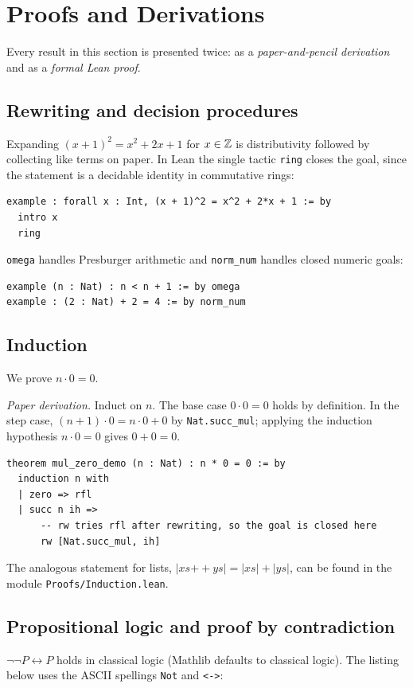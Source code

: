 \section{Proofs and Derivations}\label{sec:proofs}

Every result in this section is presented twice: as a \emph{paper-and-pencil
derivation} and as a \emph{formal Lean proof}.

\subsection{Rewriting and decision procedures}
Expanding $(x+1)^2 = x^2 + 2x + 1$ for $x\in\mathbb{Z}$ is distributivity followed
by collecting like terms on paper. In Lean the single tactic \texttt{ring}
closes the goal, since the statement is a decidable identity in commutative
rings:

\begin{lstlisting}
example : forall x : Int, (x + 1)^2 = x^2 + 2*x + 1 := by
  intro x
  ring
\end{lstlisting}

\texttt{omega} handles Presburger arithmetic and \texttt{norm\_num} handles
closed numeric goals:

\begin{lstlisting}
example (n : Nat) : n < n + 1 := by omega
example : (2 : Nat) + 2 = 4 := by norm_num
\end{lstlisting}

\subsection{Induction}
We prove $n\cdot 0 = 0$.

\noindent\emph{Paper derivation.} Induct on $n$. The base case
$0\cdot0=0$ holds by definition. In the step case,
$(n+1)\cdot0 = n\cdot0 + 0$ by \texttt{Nat.succ\_mul}; applying the
induction hypothesis $n\cdot0=0$ gives $0+0=0$.

\begin{lstlisting}
theorem mul_zero_demo (n : Nat) : n * 0 = 0 := by
  induction n with
  | zero => rfl
  | succ n ih =>
      -- rw tries rfl after rewriting, so the goal is closed here
      rw [Nat.succ_mul, ih]
\end{lstlisting}

The analogous statement for lists,
$|xs \mathbin{++} ys| = |xs|+|ys|$, can be found in the module
\texttt{Proofs/\allowbreak Induction.lean}.

\subsection{Propositional logic and proof by contradiction}
$\neg\neg P \leftrightarrow P$ holds in classical logic (Mathlib defaults to
classical logic). The listing below uses the ASCII spellings \texttt{Not}
and \texttt{<->}:

